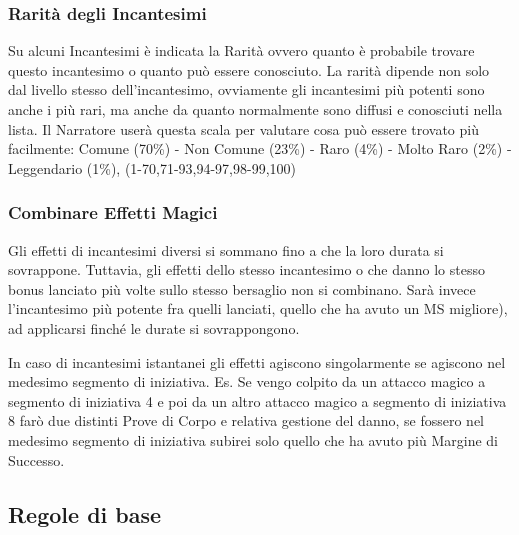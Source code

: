 \documentclass[12pt,a4paper,twoside,openany]{book}
\begin{document}
\begin{multicols}{2}
\begin{itemize}
\end{itemize}

\subsubsection{Rarità degli Incantesimi}\label{magieraritaincantesimi}

Su alcuni Incantesimi è indicata la Rarità ovvero quanto è probabile trovare questo incantesimo o quanto può essere conosciuto. La rarità dipende non solo dal livello stesso dell'incantesimo, ovviamente gli incantesimi più potenti sono anche i più rari, ma anche da quanto normalmente sono diffusi e conosciuti nella lista. Il Narratore userà questa scala per valutare cosa può essere trovato più facilmente: Comune (70\%) - Non Comune (23\%) - Raro (4\%) - Molto Raro (2\%) - Leggendario (1\%), (1-70,71-93,94-97,98-99,100)

\subsubsection{Combinare Effetti Magici}\label{magiecombinareeffettimagici}

Gli effetti di incantesimi diversi si sommano fino a che la loro durata si sovrappone. Tuttavia, gli effetti dello stesso incantesimo o che danno lo stesso bonus lanciato più volte sullo stesso bersaglio non si combinano. Sarà invece l'incantesimo più potente fra quelli lanciati, quello che ha avuto un MS migliore), ad applicarsi finché le durate si sovrappongono.

In caso di incantesimi istantanei gli effetti agiscono singolarmente se agiscono nel medesimo segmento di iniziativa. Es. Se vengo colpito da un attacco magico a segmento di iniziativa 4 e poi da un altro attacco magico a segmento di iniziativa 8 farò due distinti Prove di Corpo e relativa gestione del danno, se fossero nel medesimo segmento di iniziativa subirei solo quello che ha avuto più Margine di Successo.

\subsection{Regole di base}\label{magieregoledibase}


\begin{itemize}


\end{itemize}
\end{multicols}
\end{document}
